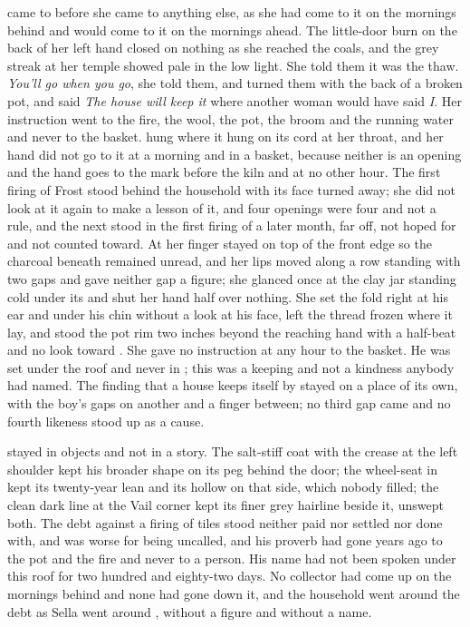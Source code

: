  came to  before she came to anything else, as she had come to it on the mornings behind and would come to it on the mornings ahead. The little-door burn on the back of her left hand closed on nothing as she reached the coals, and the grey streak at her temple showed pale in the low light. She told them it was the thaw. \emph{You'll go when you go}, she told them, and turned them with the back of a broken pot, and said \emph{The house will keep it} where another woman would have said \emph{I}. Her instruction went to the fire, the wool, the pot, the broom and the running water and never to the basket.  hung where it hung on its cord at her throat, and her hand did not go to it at a morning and in a basket, because neither is an opening and the hand goes to the mark before the kiln and at no other hour. The first firing of Frost stood behind the household with its face turned away; she did not look at it again to make a lesson of it, and four openings were four and not a rule, and the next stood in the first firing of a later month, far off, not hoped for and not counted toward. At  her finger stayed on top of the front edge so the charcoal beneath remained unread, and her lips moved along a row standing with two gaps and gave neither gap a figure; she glanced once at the clay jar standing cold under its  and shut her hand half over nothing. She set the fold right at his ear and under his chin without a look at his face, left the thread frozen where it lay, and stood the pot rim two inches beyond the reaching hand with a half-beat and no look toward . She gave no instruction at any hour to the basket. He was set under the roof and never in ; this was a keeping and not a kindness anybody had named. The finding that a house keeps itself by  stayed on a place of its own, with the boy's gaps on another and a finger between; no third gap came and no fourth likeness stood up as a cause.

 stayed in objects and not in a story. The salt-stiff coat with the crease at the left shoulder kept his broader shape on its peg behind the door; the wheel-seat in  kept its twenty-year lean and its hollow on that side, which nobody filled; the clean dark line at the Vail corner kept its finer grey hairline beside it, unswept both. The debt against a firing of tiles stood neither paid nor settled nor done with, and was worse for being uncalled, and his proverb had gone years ago to the pot and the fire and never to a person. His name had not been spoken under this roof for two hundred and eighty-two days. No collector had come up  on the mornings behind and none had gone down it, and the household went around the debt as Sella went around , without a figure and without a name.

